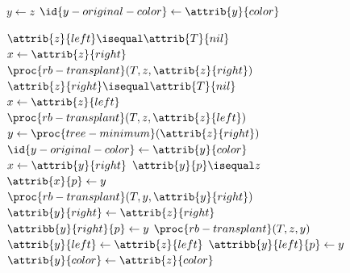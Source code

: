\documentclass[UTF8,11pt,openany]{ctexbook}
\begin{document}
\begin{figure}[ht]
	\begin{minipage}[b]{0.45\linewidth}
	\centering
	  \begin{codebox}
	    \li    $y \gets z$
	    \li    $\id{y-original-color} \gets \attrib{y}{color}$
	    
	    \li    \If $ \attrib{z}{left} \isequal \attrib{T}{nil} $
	    \li        \Then  $ x  \gets \attrib{z}{right}$
	    \li               $ \proc{rb-transplant}(T,z,\attrib{z}{right}) $
	    \li    \ElseIf    $\attrib{z}{right} \isequal \attrib{T}{nil} $
	    \li        \Then  $ x  \gets \attrib{z}{left} $
	    \li               $ \proc{rb-transplant}(T,z,\attrib{z}{left}) $
	    \li    \Else  $ y \gets \proc{tree-minimum}(\attrib{z}{right}) $
	    \li           $ \id{y-original-color} \gets \attrib{y}{color} $  			  
	    \li           $ x \gets \attrib{y}{right} $       
	    \li           \If $ \attrib{y}{p} \isequal  z $		
	    \li             \Then $ \attrib{x}{p}\gets y $
	    \li           \Else  $ \proc{rb-transplant}(T,y,\attrib{y}{right}) $ 
	    \li                  $ \attrib{y}{right} \gets \attrib{z}{right} $
	    \li                  $ \attribb{y}{right}{p} \gets y $ 
	    \End
	    \li           $ \proc{rb-transplant}(T,z,y) $ 
	    \li           $ \attrib{y}{left} \gets \attrib{z}{left} $ 
	    \li           $ \attribb{y}{left}{p} \gets y $ 
	    \li           $ \attrib{y}{color} \gets \attrib{z}{color} $ 
	    \End
	    

\end{codebox}
\end{minipage}
\end{figure}
\end{document}
